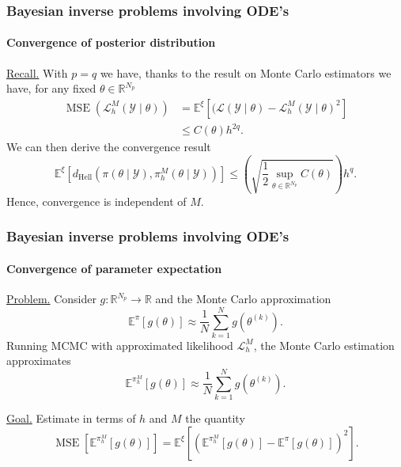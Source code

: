 \documentclass{beamer}
\newcommand{\diffL}{\mathcal{L}}
\newcommand{\R}{\mathbb{R}}
\newcommand{\E}{\mathbb{E}}
\newcommand{\MSE}{\operatorname{MSE}}
\newcommand{\Hell}{d_{\mathrm{Hell}}}
\begin{document}
\begin{frame}
	\frametitle{Bayesian inverse problems involving ODE's}
	\framesubtitle{Convergence of posterior distribution}
	
	\underline{Recall.} With $p = q$ we have, thanks to the result on Monte Carlo estimators we have, for any fixed $\theta \in \R^{N_p}$
	\begin{equation*}
	\begin{aligned}
		\MSE(\diffL_h^M (\mathcal Y \mid \theta)) &= \E^\xi[(\diffL(\mathcal Y \mid \theta) - \diffL_h^M (\mathcal Y \mid \theta)^2] \\
		&\leq C(\theta) h^{2q}.
	\end{aligned}
	\end{equation*}
	We can then derive the convergence result
	\begin{equation*}
		\E^\xi[\Hell(\pi(\theta\mid\mathcal{Y}),\pi^M_h(\theta\mid\mathcal{Y}))] \leq \left(\sqrt{\frac{1}{2} \sup_{\theta \in \R^{N_p}} C(\theta)}\right) h^q.
	\end{equation*}
	Hence, convergence is independent of $M$.
\end{frame}

\begin{frame}
	\frametitle{Bayesian inverse problems involving ODE's}
	\framesubtitle{Convergence of parameter expectation}
	
	\underline{Problem.} Consider $g \colon \R^{N_p}\to\R$ and the Monte Carlo approximation
	\begin{equation*}
		 \E^\pi\left[g(\theta)\right]  \approx \frac{1}{N}\sum_{k = 1}^{N} g(\theta^{(k)}).
	\end{equation*}
	Running MCMC with approximated likelihood $\diffL_h^M$, the Monte Carlo estimation approximates
	\begin{equation*}
		\E^{\pi_h^M}\left[g(\theta)\right]  \approx \frac{1}{N}\sum_{k = 1}^{N} g(\theta^{(k)}).
	\end{equation*}
	
	\vspace{0.5cm}
	\underline{Goal.} Estimate in terms of $h$ and $M$ the quantity
	\begin{equation*}
		\MSE[\E^{\pi_h^M}\left[g(\theta)\right]] = \E^\xi[(\E^{\pi_h^M}\left[g(\theta)\right] - \E^\pi\left[g(\theta)\right])^2].
	\end{equation*}
\end{frame}
\end{document}
